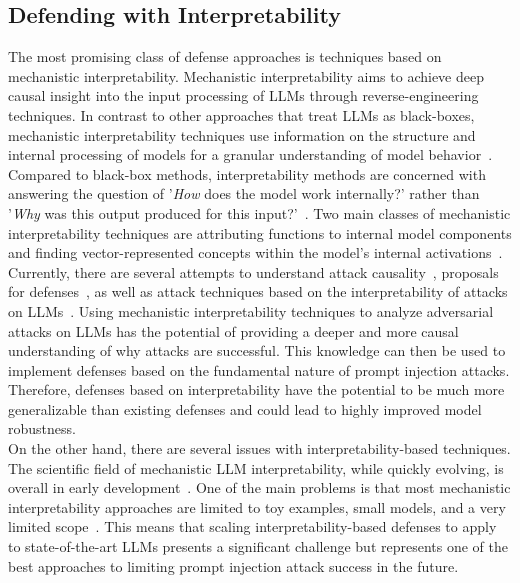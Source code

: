 \subsection{Defending with Interpretability}
The most promising class of defense approaches is techniques based on mechanistic interpretability.
Mechanistic interpretability aims to achieve deep causal insight into the input processing of LLMs through reverse-engineering techniques.
In contrast to other approaches that treat LLMs as black-boxes, mechanistic interpretability techniques use information on the structure and internal processing of models for a granular understanding of model behavior~\cite{saphra_mechanistic_2024, rai_practical_2024}.
Compared to black-box methods, interpretability methods are concerned with answering the question of '\emph{How} does the model work internally?' rather than '\emph{Why} was this output produced for this input?'~\cite{russell_artificial_2021}.
Two main classes of mechanistic interpretability techniques are attributing functions to internal model components and finding vector-represented concepts within the model's internal activations~\cite{rai_practical_2024}.\\

Currently, there are several attempts to understand attack causality~\cite{kirch_what_2025, lin_towards_2024, garcia-carrasco_detecting_2024}, proposals for defenses~\cite{bereska_mechanistic_2024}, as well as attack techniques based on the interpretability of attacks on LLMs~\cite{winninger_using_2025}.
Using mechanistic interpretability techniques to analyze adversarial attacks on LLMs has the potential of providing a deeper and more causal understanding of why attacks are successful.
This knowledge can then be used to implement defenses based on the fundamental nature of prompt injection attacks.
Therefore, defenses based on interpretability have the potential to be much more generalizable than existing defenses and could lead to highly improved model robustness.\\

On the other hand, there are several issues with interpretability-based techniques.
The scientific field of mechanistic LLM interpretability, while quickly evolving, is overall in early development~\cite{saphra_mechanistic_2024, rai_practical_2024}.
One of the main problems is that most mechanistic interpretability approaches are limited to toy examples, small models, and a very limited scope~\cite{rai_practical_2024}.
This means that scaling interpretability-based defenses to apply to state-of-the-art LLMs presents a significant challenge but represents one of the best approaches to limiting prompt injection attack success in the future.